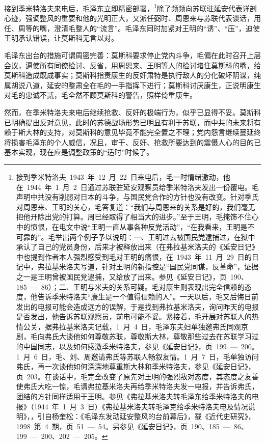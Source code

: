 接到季米特洛夫来电后，毛泽东立即精密部署，\footnote{接到季米特洛夫~1943~年~12~月~22~日来电后，毛一时情绪激动，他在~1944~年~1~月~2~日通过苏联驻延安观察员给季米特洛夫发出一份覆电。毛声明中共没有削弱对日本的斗争，与国民党合作的方针也没有改变。针对季氏对周恩来、王明的关心，毛答复道：“我们与周恩来的关系是好的，我们毫无把他开除出党的打算。周已经取得了相当大的进步。”至于王明，毛掩饰不住心中的愤恨，在电文中说“王明一直从事各种反党活动”，“在我看来，王明是不可靠的”。毛举出两个例子予以说明：一、王明过去被国民党逮捕过，在狱中承认了自己的党员身份，后来才被释放出来（在弗拉基米洛夫的《延安日记》中也提到作者本人强烈感受到毛对王明的痛恨，在~1943~年~11~月~29~日的日记中，弗拉基米洛夫写道，针对王明的新指控是“国民党同谋，反革命”，证据之一是王明曾被国民党逮捕，又给放了出来。参见《延安日记》，页~190、185~—~86）；二、王明与米夫的关系可疑。毛对康生则表现出完全信赖的态度，他告诉季米特洛夫“康生是一个值得信赖的人”。一天以后，毛又后悔日前发出的电报可能会造成远方的误解，于是找到弗拉基米洛夫，询问昨天的电报是否发出，他告诉苏联观察员，前电可能不妥。紧接着，毛开展对苏联人的热情公关，据弗拉基米洛夫记载，1~月~4~日，毛泽东夫妇单独邀弗氏同观京剧，毛向弗氏大谈他如何尊敬苏联，尊敬斯大林，尊敬那些过去在苏联学习过的中国同志，以及如何感激季米特洛夫，参见《延安日记》，页~199~—~200。1~月~6~日，毛、刘、周邀请弗氏等苏联人畅叙友情。1~月~7~日，毛单独访问弗氏，再一次谈他如何深深地尊重斯大林和季米特洛夫，参见《延安日记》，页~203。在谈话中，毛完全改变了原先对王明的强烈敌对态度，其态度之友善使弗氏大吃一惊，毛请弗拉基米洛夫再给季米特洛夫发一电报，并告诉弗氏，团结的方针同样适用于王明。参见《弗拉基米洛夫转毛泽东给季米特洛夫的电报》（1944~年~1~月~3~日）《弗拉基米洛夫转毛泽克给季米特洛夫电及情况说明》，，引自杨奎松：《毛泽东发动延安整风的台前幕后》，载《近代史研究》，1998~第~4~期，页~51~—~54。另参见《延安日记》，页~190、185~—~86、199~—~200、202~—~205。}除了频频向苏联驻延安代表详剖心迹，强调整风的重要和他的光明正大，又派任弼时、周恩来与苏联代表谈话，用任、周等的嘴，澄清毛整人的“流言”。毛泽东同时加紧对王明的“诱”、“压”，迫使王明承认错误，让莫斯科无言以对。

毛泽东出台的措施可谓周密完善：莫斯科要求停止党内斗争，毛偏在此时召开上层会议，逼使所有同僚检讨、反省，用周恩来、王明等人的检讨堵住莫斯科的嘴，给莫斯科造成既成事实；莫斯科指责康生的反奸肃特是执行敌人的分化破坏阴谋，纯属胡说八道，延安的整肃全在毛的一手指挥下进行；莫斯科讨厌康生，正说明康生对毛的忠诚不贰，毛全然不顾莫斯科的警告，照样倚重康生。

然而，在季米特洛夫来电后继续抢救、反奸的极端行为，似乎已显得不妥。莫斯科已明确提出反对意见，此时的苏德战场形势已明显有利于苏联，而中共的未来将有赖于斯大林的支持，对莫斯科的意见毕竟不能完全置之不理；党内怨言继续蔓延终将损害毛泽东的个人威信，况且，审干、反奸、抢救所要达到的震慑人心的目的已基本实现，现在应是调整政策的“适时”时候了。

